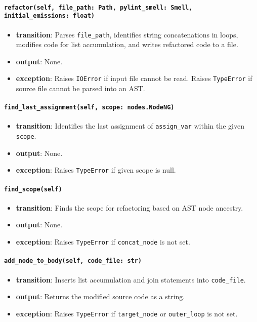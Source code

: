 \documentclass[12pt, titlepage]{article}
\begin{document}
\paragraph{\texttt{refactor(self, file\_path: Path, pylint\_smell: Smell, initial\_emissions: float)}}
\begin{itemize}
  \item \textbf{transition}: Parses \texttt{file\_path}, identifies string concatenations in loops, modifies code for list accumulation, and writes refactored code to a file.
  \item \textbf{output}: None.
  \item \textbf{exception}: Raises \texttt{IOError} if input file cannot be read. Raises \texttt{TypeError} if source file cannot be parsed into an AST.
\end{itemize}

\paragraph{\texttt{find\_last\_assignment(self, scope: nodes.NodeNG)}}
\begin{itemize}
  \item \textbf{transition}: Identifies the last assignment of \texttt{assign\_var} within the given \texttt{scope}.
  \item \textbf{output}: None.
  \item \textbf{exception}: Raises \texttt{TypeError} if given scope is null.
\end{itemize}

\paragraph{\texttt{find\_scope(self)}}
\begin{itemize}
  \item \textbf{transition}: Finds the scope for refactoring based on AST node ancestry.
  \item \textbf{output}: None.
  \item \textbf{exception}: Raises \texttt{TypeError} if \texttt{concat\_node} is not set.
\end{itemize}

\paragraph{\texttt{add\_node\_to\_body(self, code\_file: str)}}
\begin{itemize}
  \item \textbf{transition}: Inserts list accumulation and join statements into \texttt{code\_file}.
  \item \textbf{output}: Returns the modified source code as a string.
  \item \textbf{exception}: Raises \texttt{TypeError} if \texttt{target\_node} or \texttt{outer\_loop} is not set.
\end{itemize}
\end{document}
